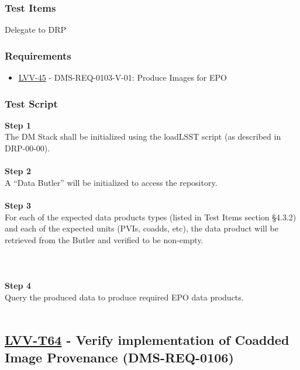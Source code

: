 \hypertarget{test-items-39}{%
\subsubsection{Test Items}\label{test-items-39}}

Delegate to DRP

\hypertarget{requirements-40}{%
\subsubsection{Requirements}\label{requirements-40}}

\begin{itemize}
\tightlist
\item
  \href{https://jira.lsstcorp.org/browse/LVV-45}{LVV-45} -
  DMS-REQ-0103-V-01: Produce Images for EPO
\end{itemize}

\hypertarget{test-script-40}{%
\subsubsection{Test Script}\label{test-script-40}}

\textbf{Step 1}\\
The DM Stack shall be initialized using the loadLSST script (as
described in DRP-00-00).\\
~\\
\textbf{Step 2}\\
A ``Data Butler'' will be initialized to access the repository.\\
~\\
\textbf{Step 3}\\
For each of the expected data products types (listed in Test Items
section §4.3.2) and each of the expected units (PVIs, coadds, etc), the
data product will be retrieved from the Butler and verified to be
non-empty.\\
~\\
~\\
~\\
\textbf{Step 4}\\
Query the produced data to produce required EPO data products.\\
~\\

\hypertarget{lvv-t64---verify-implementation-of-coadded-image-provenance-dms-req-0106}{%
\subsection{\texorpdfstring{\href{https://jira.lsstcorp.org/secure/Tests.jspa\#/testCase/LVV-T64}{LVV-T64}
- Verify implementation of Coadded Image Provenance
(DMS-REQ-0106)}{LVV-T64 - Verify implementation of Coadded Image Provenance (DMS-REQ-0106)}}\label{lvv-t64---verify-implementation-of-coadded-image-provenance-dms-req-0106}}

